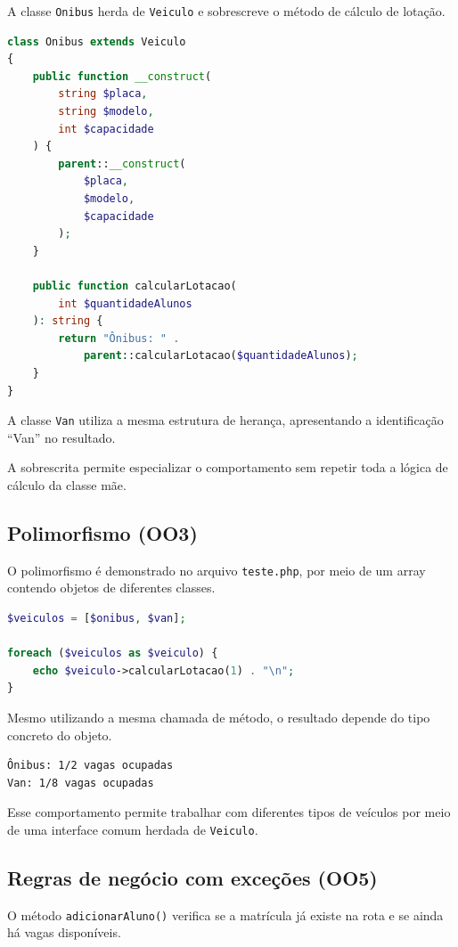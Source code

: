 \documentclass[12pt,a4paper]{article}
\begin{document}
A classe \texttt{Onibus} herda de \texttt{Veiculo} e sobrescreve o método de cálculo de lotação.

\begin{lstlisting}[language=PHP]
class Onibus extends Veiculo
{
    public function __construct(
        string $placa,
        string $modelo,
        int $capacidade
    ) {
        parent::__construct(
            $placa,
            $modelo,
            $capacidade
        );
    }

    public function calcularLotacao(
        int $quantidadeAlunos
    ): string {
        return "Ônibus: " .
            parent::calcularLotacao($quantidadeAlunos);
    }
}
\end{lstlisting}

A classe \texttt{Van} utiliza a mesma estrutura de herança, apresentando a identificação ``Van'' no resultado.

A sobrescrita permite especializar o comportamento sem repetir toda a lógica de cálculo da classe mãe.

\subsection{Polimorfismo (OO3)}

O polimorfismo é demonstrado no arquivo \texttt{teste.php}, por meio de um array contendo objetos de diferentes classes.

\begin{lstlisting}[language=PHP]
$veiculos = [$onibus, $van];

foreach ($veiculos as $veiculo) {
    echo $veiculo->calcularLotacao(1) . "\n";
}
\end{lstlisting}

Mesmo utilizando a mesma chamada de método, o resultado depende do tipo concreto do objeto.

\begin{lstlisting}
Ônibus: 1/2 vagas ocupadas
Van: 1/8 vagas ocupadas
\end{lstlisting}

Esse comportamento permite trabalhar com diferentes tipos de veículos por meio de uma interface comum herdada de \texttt{Veiculo}.

\subsection{Regras de negócio com exceções (OO5)}

O método \texttt{adicionarAluno()} verifica se a matrícula já existe na rota e se ainda há vagas disponíveis.
\end{document}
